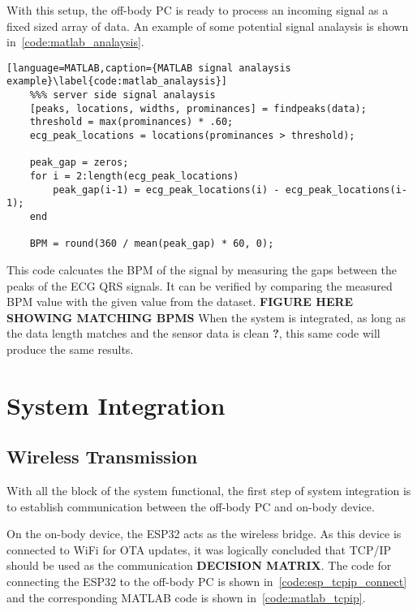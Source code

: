 With this setup, the off-body PC is ready to process an incoming signal as a fixed sized array of data.
An example of some potential signal analaysis is shown in~\autoref{code:matlab_analaysis}.

\begin{lstlisting}[language=MATLAB,caption={MATLAB signal analaysis example}\label{code:matlab_analaysis}]
    %%% server side signal analaysis
    [peaks, locations, widths, prominances] = findpeaks(data);
    threshold = max(prominances) * .60;
    ecg_peak_locations = locations(prominances > threshold);

    peak_gap = zeros;
    for i = 2:length(ecg_peak_locations)
        peak_gap(i-1) = ecg_peak_locations(i) - ecg_peak_locations(i-1);
    end

    BPM = round(360 / mean(peak_gap) * 60, 0);
\end{lstlisting}

This code calcuates the BPM of the signal by measuring the gaps between the peaks of the ECG QRS signals.
It can be verified by comparing the measured BPM value with the given value from the dataset.
\textbf{FIGURE HERE SHOWING MATCHING BPMS}
When the system is integrated, as long as the data length matches and the sensor data is clean \textbf{?},
this same code will produce the same results.


\section{System Integration}
\subsection{Wireless Transmission}
With all the block of the system functional,
the first step of system integration is to establish communication between the off-body PC and on-body device.

On the on-body device, the ESP32 acts as the wireless bridge.
As this device is connected to WiFi for OTA updates, it was logically concluded that TCP/IP should be used as the communication \textbf{DECISION MATRIX}.
The code for connecting the ESP32 to the off-body PC is shown in~\autoref{code:esp_tcpip_connect} and the corresponding MATLAB code is shown in~\autoref{code:matlab_tcpip}.

